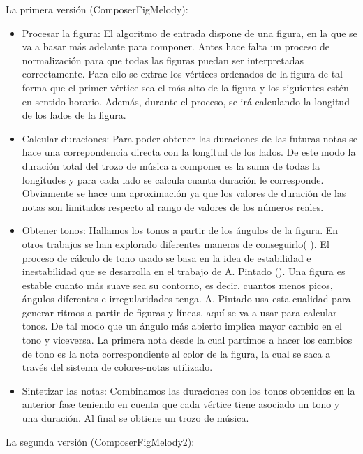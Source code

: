 La primera versión (ComposerFigMelody):
\begin{itemize}
	\item Procesar la figura: El algoritmo de entrada dispone de una figura, en la que se va a basar más adelante para componer. Antes hace falta un proceso de normalización para que todas las figuras puedan ser interpretadas correctamente. Para ello se extrae los vértices ordenados de la figura de tal forma que el primer vértice sea el más alto de la figura y los siguientes estén en sentido horario. Además, durante el proceso, se irá calculando la longitud de los lados de la figura.

	\item Calcular duraciones: Para poder obtener las duraciones de las futuras notas se hace una correpondencia directa con la longitud de los lados. De este modo la duración total del trozo de música a componer es la suma de todas la longitudes y para cada lado se calcula cuanta duración le corresponde. Obviamente se hace una aproximación ya que los valores de duración de las notas son limitados respecto al rango de valores de los números reales.

	\item Obtener tonos: Hallamos los tonos a partir de los ángulos de la figura. En otros trabajos se han explorado diferentes maneras de conseguirlo(\cite{bricksConvertsMusic} \cite{ImageBaseComposition}). El proceso de cálculo de tono usado se basa en la idea de estabilidad e inestabilidad que se desarrolla en el trabajo de A. Pintado (\cite{portutesis}). Una figura es estable cuanto más suave sea su contorno, es decir, cuantos menos picos, ángulos diferentes e irregularidades tenga. A. Pintado usa esta cualidad para generar ritmos a partir de figuras y líneas, aquí se va a usar para calcular tonos. De tal modo que un ángulo más abierto implica mayor cambio en el tono y viceversa. La primera nota desde la cual partimos a hacer los cambios de tono es la nota correspondiente al color de la figura, la cual se saca a través del sistema de colores-notas utilizado.

	\item Sintetizar las notas: Combinamos las duraciones con los tonos obtenidos en la anterior fase teniendo en cuenta que cada vértice tiene asociado un tono y una duración. Al final se obtiene un trozo de música.

\end{itemize}

La segunda versión (ComposerFigMelody2):

